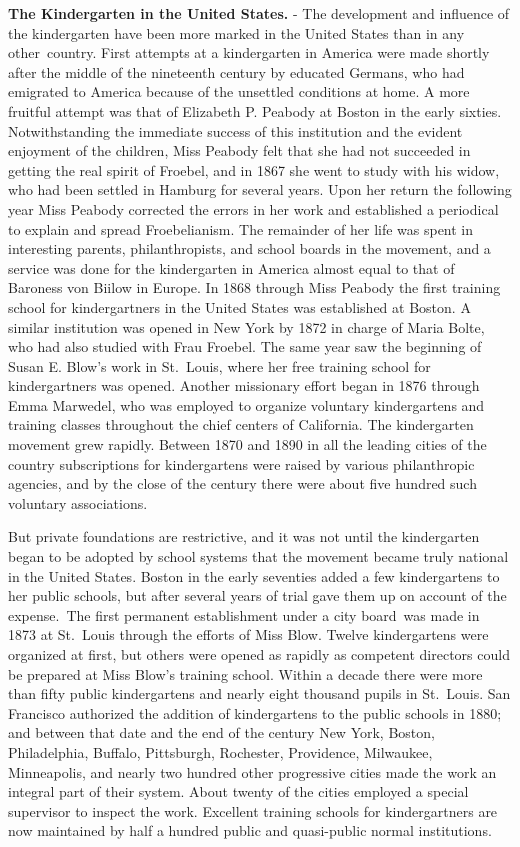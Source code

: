 \documentclass[
]{book}
\begin{document}
\textbf{The Kindergarten in the United States.} - The development and influence of the kindergarten have been more marked in the United States than in any other~country. First attempts at a kindergarten in America were made shortly after the middle of the nineteenth century by educated Germans, who had emigrated to America because of the unsettled conditions at home. A more fruitful attempt was that of Elizabeth P. Peabody at Boston in the early sixties. Notwithstanding the immediate success of this institution and the evident enjoyment of the children, Miss Peabody felt that she had not succeeded in getting the real spirit of Froebel, and in 1867 she went to study with his widow, who had been settled in Hamburg for several years. Upon her return the following year Miss Peabody corrected the errors in her work and established a periodical to explain and spread Froebelianism. The remainder of her life was spent in interesting parents, philanthropists, and school boards in the movement, and a service was done for the kindergarten in America almost equal to that of Baroness von Biilow in Europe. In 1868 through Miss Peabody the first training school for kindergartners in the United States was established at Boston. A similar institution was opened in New York by 1872 in charge of Maria Bolte, who had also studied with Frau Froebel. The same year saw the beginning of Susan E. Blow's work in St.~Louis, where her free training school for kindergartners was opened. Another missionary effort began in 1876 through Emma Marwedel, who was employed to organize voluntary kindergartens and training classes throughout the chief centers of California. The kindergarten movement grew rapidly. Between 1870 and 1890 in all the leading cities of the country subscriptions for kindergartens were raised by various philanthropic agencies, and by the close of the century there were about five hundred such voluntary associations.

But private foundations are restrictive, and it was not until the kindergarten began to be adopted by school systems that the movement became truly national in the United States. Boston in the early seventies added a few kindergartens to her public schools, but after several years of trial gave them up on account of the expense.~The first permanent establishment under a city board~was made in 1873 at St.~Louis through the efforts of Miss Blow. Twelve kindergartens were organized at first, but others were opened as rapidly as competent directors could be prepared at Miss Blow's training school. Within a decade there were more than fifty public kindergartens and nearly eight thousand pupils in St.~Louis. San Francisco authorized the addition of kindergartens to the public schools in 1880; and between that date and the end of the century New York, Boston, Philadelphia, Buffalo, Pittsburgh, Rochester, Providence, Milwaukee, Minneapolis, and nearly two hundred other progressive cities made the work an integral part of their system. About twenty of the cities employed a special supervisor to inspect the work. Excellent training schools for kindergartners are now maintained by half a hundred public and quasi-public normal institutions.
\end{document}
